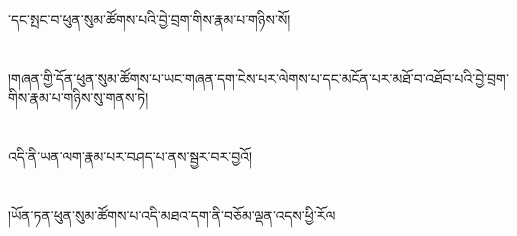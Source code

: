 ་དང་སྤང་བ་ཕུན་སུམ་ཚོགས་པའི་བྱེ་བྲག་གིས་རྣམ་པ་གཉིས་སོ།\chapter{ }།གཞན་གྱི་དོན་ཕུན་སུམ་ཚོགས་པ་ཡང་གཞན་དག་ངེས་པར་ལེགས་པ་དང་མངོན་པར་མཐོ་བ་འཐོབ་པའི་བྱེ་བྲག་གིས་རྣམ་པ་གཉིས་སུ་གནས་ཏེ།\chapter{ }འདི་ནི་ཡན་ལག་རྣམ་པར་བཤད་པ་ནས་སྦྱར་བར་བྱའོ།\chapter{ }།ཡོན་ཏན་ཕུན་སུམ་ཚོགས་པ་འདི་མཐའ་དག་ནི་བཅོམ་ལྡན་འདས་ཕྱི་རོལ